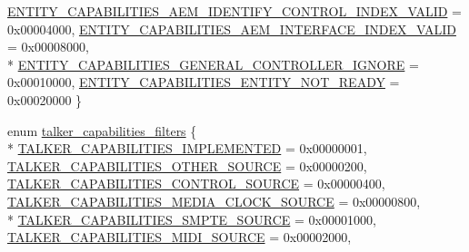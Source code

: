 \begin{DoxyCompactItemize}
\hyperlink{namespaceavdecc__lib_a7904f1f7ce9b1358c7158a9dffc7319da71a7b0ff99e3202fb031582289852b02}{E\+N\+T\+I\+T\+Y\+\_\+\+C\+A\+P\+A\+B\+I\+L\+I\+T\+I\+E\+S\+\_\+\+A\+E\+M\+\_\+\+I\+D\+E\+N\+T\+I\+F\+Y\+\_\+\+C\+O\+N\+T\+R\+O\+L\+\_\+\+I\+N\+D\+E\+X\+\_\+\+V\+A\+L\+ID} = 0x00004000, 
\hyperlink{namespaceavdecc__lib_a7904f1f7ce9b1358c7158a9dffc7319da9f7f72e16d61d08c4b044c0ddf417f77}{E\+N\+T\+I\+T\+Y\+\_\+\+C\+A\+P\+A\+B\+I\+L\+I\+T\+I\+E\+S\+\_\+\+A\+E\+M\+\_\+\+I\+N\+T\+E\+R\+F\+A\+C\+E\+\_\+\+I\+N\+D\+E\+X\+\_\+\+V\+A\+L\+ID} = 0x00008000, 
\\*
\hyperlink{namespaceavdecc__lib_a7904f1f7ce9b1358c7158a9dffc7319da913cd2c42673f0f5147c585764823b28}{E\+N\+T\+I\+T\+Y\+\_\+\+C\+A\+P\+A\+B\+I\+L\+I\+T\+I\+E\+S\+\_\+\+G\+E\+N\+E\+R\+A\+L\+\_\+\+C\+O\+N\+T\+R\+O\+L\+L\+E\+R\+\_\+\+I\+G\+N\+O\+RE} = 0x00010000, 
\hyperlink{namespaceavdecc__lib_a7904f1f7ce9b1358c7158a9dffc7319daa95b8e9f579e9cc624e814858927d54a}{E\+N\+T\+I\+T\+Y\+\_\+\+C\+A\+P\+A\+B\+I\+L\+I\+T\+I\+E\+S\+\_\+\+E\+N\+T\+I\+T\+Y\+\_\+\+N\+O\+T\+\_\+\+R\+E\+A\+DY} = 0x00020000
 \}
\item 
enum \hyperlink{namespaceavdecc__lib_a56bc09f9e88216219c73dfd659c17a03}{talker\+\_\+capabilities\+\_\+filters} \{ \\*
\hyperlink{namespaceavdecc__lib_a56bc09f9e88216219c73dfd659c17a03a4202467d2f57a3772209ec3bdbd1ee6f}{T\+A\+L\+K\+E\+R\+\_\+\+C\+A\+P\+A\+B\+I\+L\+I\+T\+I\+E\+S\+\_\+\+I\+M\+P\+L\+E\+M\+E\+N\+T\+ED} = 0x00000001, 
\hyperlink{namespaceavdecc__lib_a56bc09f9e88216219c73dfd659c17a03a7ec943145e487839df027c36eebc256a}{T\+A\+L\+K\+E\+R\+\_\+\+C\+A\+P\+A\+B\+I\+L\+I\+T\+I\+E\+S\+\_\+\+O\+T\+H\+E\+R\+\_\+\+S\+O\+U\+R\+CE} = 0x00000200, 
\hyperlink{namespaceavdecc__lib_a56bc09f9e88216219c73dfd659c17a03a795a3ede37367c1b47825581795e7f13}{T\+A\+L\+K\+E\+R\+\_\+\+C\+A\+P\+A\+B\+I\+L\+I\+T\+I\+E\+S\+\_\+\+C\+O\+N\+T\+R\+O\+L\+\_\+\+S\+O\+U\+R\+CE} = 0x00000400, 
\hyperlink{namespaceavdecc__lib_a56bc09f9e88216219c73dfd659c17a03ad28db24ff43e313ebabae7065bcae424}{T\+A\+L\+K\+E\+R\+\_\+\+C\+A\+P\+A\+B\+I\+L\+I\+T\+I\+E\+S\+\_\+\+M\+E\+D\+I\+A\+\_\+\+C\+L\+O\+C\+K\+\_\+\+S\+O\+U\+R\+CE} = 0x00000800, 
\\*
\hyperlink{namespaceavdecc__lib_a56bc09f9e88216219c73dfd659c17a03ad406a33214dca941a44f2d8dc67b74c2}{T\+A\+L\+K\+E\+R\+\_\+\+C\+A\+P\+A\+B\+I\+L\+I\+T\+I\+E\+S\+\_\+\+S\+M\+P\+T\+E\+\_\+\+S\+O\+U\+R\+CE} = 0x00001000, 
\hyperlink{namespaceavdecc__lib_a56bc09f9e88216219c73dfd659c17a03afa09f5077e03762537549b1005137bfe}{T\+A\+L\+K\+E\+R\+\_\+\+C\+A\+P\+A\+B\+I\+L\+I\+T\+I\+E\+S\+\_\+\+M\+I\+D\+I\+\_\+\+S\+O\+U\+R\+CE} = 0x00002000, 

\end{DoxyCompactItemize}
